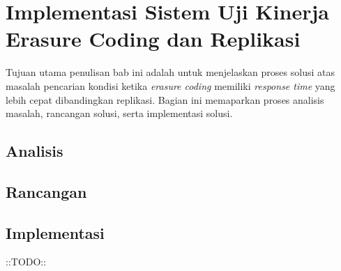 \chapter{Implementasi Sistem Uji Kinerja Erasure Coding dan Replikasi}

Tujuan utama penulisan bab ini adalah untuk menjelaskan proses solusi atas masalah pencarian kondisi ketika \textit{erasure coding} memiliki \textit{response time} yang lebih cepat dibandingkan replikasi. Bagian ini memaparkan proses analisis masalah, rancangan solusi, serta implementasi solusi.


\section{Analisis}







\section{Rancangan}



\section{Implementasi}

::TODO::